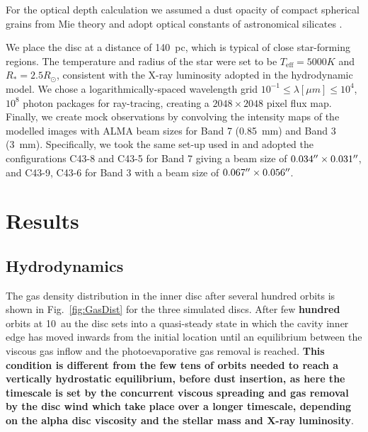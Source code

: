 \documentclass[fleqn,usenatbib]{mnras}
\begin{document}
         For the optical depth calculation we assumed a dust opacity of compact spherical grains from Mie theory and adopt optical constants of astronomical silicates \citep{Draine2003}.

         We place the disc at a distance of \SI{140}{pc}, which is typical of close star-forming regions.
         The temperature and radius of the star were set to be $T_\mathrm{eff}=5000 K$ and $R_*=2.5 R_\odot$, consistent with the X-ray luminosity adopted in the hydrodynamic model.
         We chose a logarithmically-spaced wavelength grid $10^{-1} \leq \lambda [\mu m] \leq 10^4$, $10^8$ photon packages for ray-tracing, creating a $2048\times2048$ pixel flux map.
         Finally, we create mock observations by convolving the intensity maps of the modelled images with ALMA beam sizes for Band 7 (\SI{0.85}{mm}) and Band 3 (\SI{3}{mm}). Specifically, we took the same set-up used in \cite{Nazari_2019} and adopted the configurations C43-8 and C43-5 for Band 7 giving a beam size of $0.034 \hbox{$^{\prime\prime}$} \times 0.031 \hbox{$^{\prime\prime}$}$, and C43-9, C43-6 for Band 3 with a beam size of $0.067 \hbox{$^{\prime\prime}$} \times 0.056 \hbox{$^{\prime\prime}$}$.

\section{Results}\label{sec:results}

    \subsection{Hydrodynamics} \label{sec:results-gas}

        The gas density distribution in the inner disc after several hundred orbits is shown in Fig.~\ref{fig:GasDist} for the three simulated discs. After few \textbf{hundred} orbits at \SI{10}{au} the disc sets into a quasi-steady state in which the cavity inner edge has moved inwards from the initial location until an equilibrium between the viscous gas inflow and the photoevaporative gas removal is reached. \textbf{This condition is different from the few tens of orbits needed to reach a vertically hydrostatic equilibrium, before dust insertion, as here the timescale is set by the concurrent viscous spreading and gas removal by the disc wind which take place over a longer timescale, depending on the alpha disc viscosity and the stellar mass and X-ray luminosity}.
\end{document}
